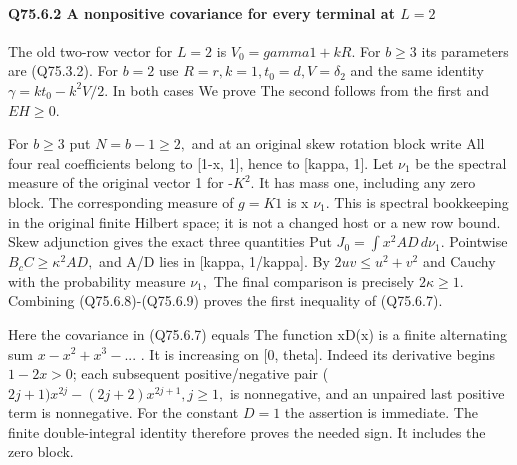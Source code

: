 \paragraph{Q75.6.2 A nonpositive covariance for every terminal at \(L=2\)}

The old two-row vector for \(L=2\) is \(V_0=gamma1+kR.\) For \(b\ge 3\) its
parameters are (Q75.3.2). For \(b=2\) use \(R=r,\allowbreak  k=1,\allowbreak  t_0=d,\allowbreak  V=\delta_2\) and the
same identity \(\gamma=kt_0-k^2V/2.\) In both cases
We prove
The second follows from the first and \(EH\ge 0.\)

For \(b\ge 3\) put \(N=b-1\ge 2,\allowbreak \) and at an original skew rotation block write
All four real coefficients belong to [1-x, 1], hence to [kappa, 1].
Let \(\nu_1\) be the spectral measure of the original vector 1 for -\(K^2.\)
It has mass one, including any zero block. The corresponding measure
of \(g=K1\) is x \(\nu_1.\) This is spectral bookkeeping in the original
finite Hilbert space; it is not a changed host or a new row bound.
Skew adjunction gives the exact three quantities
Put \(J_0=\int x^2AD\,d\nu_1\). Pointwise \(B_cC\ge \kappa^2AD,\allowbreak \) and
A/D lies in [kappa, 1/kappa]. By \(2uv\le u^2+v^2\) and Cauchy with
the probability measure \(\nu_1,\allowbreak \)
The final comparison is precisely \(2\kappa\ge 1.\) Combining (Q75.6.8)-(Q75.6.9)
proves the first inequality of (Q75.6.7).


Here the covariance in (Q75.6.7) equals
The function xD(x) is a finite alternating sum \(x-x^2+x^3-...\) .
It is increasing on [0, theta]. Indeed its derivative begins \(1-2x>0\);
each subsequent positive/negative pair
(\(2j+1)x^{2j}-(2j+2)x^{2j+1},\allowbreak  j\ge 1,\allowbreak \) is nonnegative, and an
unpaired last positive term is nonnegative. For the constant \(D=1\)
the assertion is immediate. The finite double-integral identity
therefore proves the needed sign. It includes the zero block.

